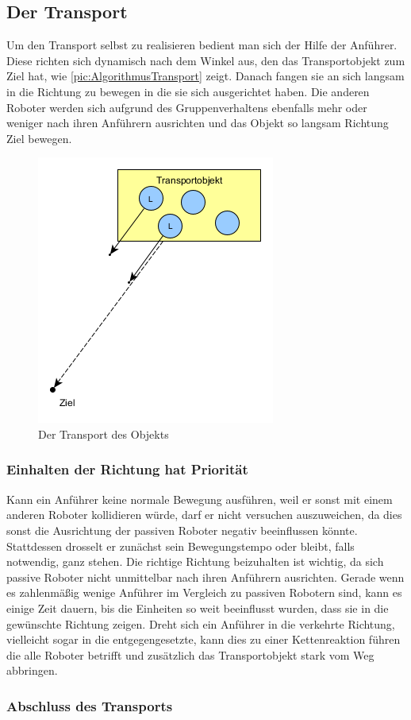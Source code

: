 \subsection*{Der Transport}

Um den Transport selbst zu realisieren bedient man sich der Hilfe der Anführer. Diese richten sich dynamisch nach dem Winkel aus, den das Transportobjekt zum Ziel hat, wie \autoref{pic:AlgorithmusTransport} zeigt. Danach fangen sie an sich langsam in die Richtung zu bewegen in die sie sich ausgerichtet haben. Die anderen Roboter werden sich aufgrund des Gruppenverhaltens ebenfalls mehr oder weniger nach ihren Anführern ausrichten und das Objekt so langsam Richtung Ziel bewegen.

\begin{figure}
	\includegraphics[width=\pictureWidth,keepaspectratio]{graphics/AlgorithmusTransport.png}
	\caption{Der Transport des Objekts}
	\label{pic:AlgorithmusTransport}
\end{figure}

\subsubsection*{Einhalten der Richtung hat Priorität}
Kann ein Anführer keine normale Bewegung ausführen, weil er sonst mit einem anderen Roboter kollidieren würde, darf er nicht versuchen auszuweichen, da dies sonst die Ausrichtung der passiven Roboter negativ beeinflussen könnte. Stattdessen drosselt er zunächst sein Bewegungstempo oder bleibt, falls notwendig, ganz stehen. Die richtige Richtung beizuhalten ist wichtig, da sich passive Roboter nicht unmittelbar nach ihren Anführern ausrichten. Gerade wenn es zahlenmäßig wenige Anführer im Vergleich zu passiven Robotern sind, kann es einige Zeit dauern, bis die Einheiten so weit beeinflusst wurden, dass sie in die gewünschte Richtung zeigen. Dreht sich ein Anführer in die verkehrte Richtung, vielleicht sogar in die entgegengesetzte, kann dies zu einer Kettenreaktion führen die alle Roboter betrifft und zusätzlich das Transportobjekt stark vom Weg abbringen.

\subsubsection*{Abschluss des Transports}






